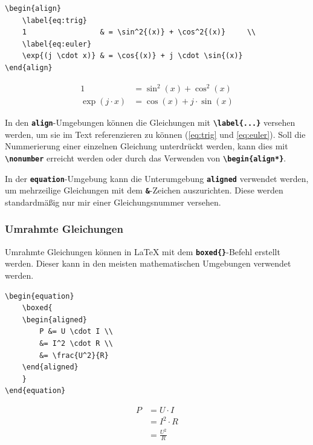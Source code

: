 \begin{lstlisting}[language={[LaTeX]TeX}]
\begin{align}
    \label{eq:trig}
    1                 & = \sin^2{(x)} + \cos^2{(x)}     \\
    \label{eq:euler}
    \exp{(j \cdot x)} & = \cos{(x)} + j \cdot \sin{(x)}
\end{align}
\end{lstlisting}

\begin{align}
    \label{eq:trig}
    1                 & = \sin^2{(x)} + \cos^2{(x)}     \\
    \label{eq:euler}
    \exp{(j \cdot x)} & = \cos{(x)} + j \cdot \sin{(x)}
\end{align}

In den \textbf{\texttt{align}}-Umgebungen können die Gleichungen mit \textbf{\texttt{\textbackslash label\{...\}}} versehen werden, um sie im Text referenzieren zu können (\autoref{eq:trig} und \autoref{eq:euler}). Soll die Nummerierung einer einzelnen Gleichung unterdrückt werden, kann dies mit \textbf{\texttt{\textbackslash nonumber}} erreicht werden oder durch das Verwenden von \textbf{\texttt{\textbackslash begin\{align*\}}}.

In der \textbf{\texttt{equation}}-Umgebung kann die Unterumgebung \textbf{\texttt{aligned}} verwendet werden, um mehrzeilige Gleichungen mit dem \textbf{\texttt{\&}}-Zeichen auszurichten. Diese werden standardmäßig nur mir einer Gleichungsnummer versehen.

\subsubsection{Umrahmte Gleichungen}
Umrahmte Gleichungen können in \LaTeX{} mit dem \textbf{\texttt{boxed\{\}}}-Befehl erstellt werden. Dieser kann in den meisten mathematischen Umgebungen verwendet werden.

\begin{minipage}{0.5\textwidth}
    \begin{lstlisting}[language={[LaTeX]TeX}]
\begin{equation}
    \boxed{
    \begin{aligned}
        P &= U \cdot I \\
        &= I^2 \cdot R \\
        &= \frac{U^2}{R}
    \end{aligned}
    }
\end{equation}
\end{lstlisting}
\end{minipage}
\hfill
\begin{minipage}{0.5\textwidth}
    \begin{equation}
        \boxed{
            \begin{aligned}
                P & = U \cdot I     \\
                  & = I^2 \cdot R   \\
                  & = \frac{U^2}{R}
            \end{aligned}
        }
    \end{equation}
\end{minipage}




